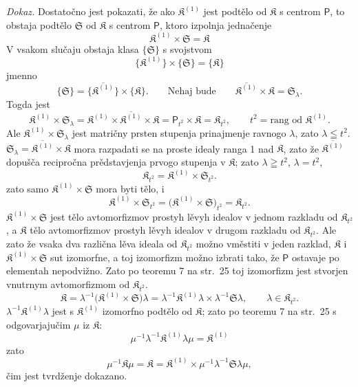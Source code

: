 \documentclass[11pt]{article}
\begin{document}
\emph{Dokaz.} Dostatočno jest pokazati, že ako \(\mathfrak K^{(1)}\) jest podtělo od \(\mathfrak K\) s centrom \(\mathsf P\), to obstaja podtělo \(\mathfrak S\) od \(\mathfrak K\) s centrom \(\mathsf P\), ktoro izpolnja jednačenje
\[
\mathfrak K^{(1)}\times\mathfrak S=\mathfrak K
\]
V vsakom slučaju obstaja klasa \(\{\mathfrak S\}\) s svojstvom
\[
\{\mathfrak K^{(1)}\}\times\{\mathfrak S\}=\{\mathfrak K\}
\]
jmenno
\[
\{\mathfrak S\}=\{\overline{\mathfrak K^{(1)}}\}\times\{\mathfrak K\}.
\qquad
\text{Nehaj bude}\qquad
\overline{\mathfrak K^{(1)}}\times\mathfrak K=\mathfrak S_\lambda.
\]
Togda jest
\[
\mathfrak K^{(1)}\times\mathfrak S_\lambda
=\mathfrak K^{(1)}\times\overline{\mathfrak K^{(1)}}\times\mathfrak K
=\mathsf P_{t^2}\times\mathfrak K
=\mathfrak K_{t^2},
\qquad
t^2=\text{rang od }\mathfrak K^{(1)}.
\]
Ale \(\mathfrak K^{(1)}\times\mathfrak S_\lambda\) jest matričny prsten stupenja prinajmenje ravnogo \(\lambda\), zato \(\lambda\leqq t^2\). \(\mathfrak S_\lambda=\overline{\mathfrak K^{(1)}}\times\mathfrak K\) mora razpadati se na proste idealy ranga 1 nad \(\mathfrak K\), zato že \(\overline{\mathfrak K^{(1)}}\) dopušča recipročna prědstavjenja prvogo stupenja v \(\mathfrak K\); zato \(\lambda\geqq t^2\), \(\lambda=t^2\),
\[
\mathfrak K_{t^2}=\mathfrak K^{(1)}\times\mathfrak S_{t^2}.
\]
zato samo \(\mathfrak K^{(1)}\times\mathfrak S\) mora byti tělo, i
\[
\mathfrak K^{(1)}\times\mathfrak S_{t^2}
=\bigl(\mathfrak K^{(1)}\times\mathfrak S\bigr)_{t^2}
=\mathfrak K_{t^2}.
\]
\(\mathfrak K^{(1)}\times\mathfrak S\) jest tělo avtomorfizmov prostyh lěvyh idealov v jednom razkladu od \(\mathfrak K_{t^2}\), a \(\mathfrak K\) tělo avtomorfizmov prostyh lěvyh idealov v drugom razkladu od \(\mathfrak K_{t^2}\). Ale zato že vsaka dva različna lěva ideala od \(\mathfrak K_{t^2}\) možno vměstiti v jeden razklad, \(\mathfrak K\) i \(\mathfrak K^{(1)}\times\mathfrak S\) sut izomorfne, a toj izomorfizm možno izbrati tako, že \(\mathsf P\) ostavaje po elementah nepodvižno. Zato po teoremu 7 na str.~25 toj izomorfizm jest stvorjen vnutrnym avtomorfizmom od \(\mathfrak K_{t^2}\).
\[
\mathfrak K
=\lambda^{-1}\bigl(\mathfrak K^{(1)}\times\mathfrak S\bigr)\lambda
=\lambda^{-1}\mathfrak K^{(1)}\lambda\times\lambda^{-1}\mathfrak S\lambda,
\qquad
\lambda\in\mathfrak K_{t^2}.
\]
\(\lambda^{-1}\mathfrak K^{(1)}\lambda\) jest s \(\mathfrak K^{(1)}\) izomorfno podtělo od \(\mathfrak K\); zato po teoremu 7 na str.~25 s odgovarjajučim \(\mu\) iz \(\mathfrak K\):
\[
\mu^{-1}\lambda^{-1}\mathfrak K^{(1)}\lambda\mu=\mathfrak K^{(1)}
\]
zato
\[
\mu^{-1}\mathfrak K\mu
=\mathfrak K
=\mathfrak K^{(1)}\times\mu^{-1}\lambda^{-1}\mathfrak S\lambda\mu,
\]
čim jest tvrdženje dokazano.
\end{document}
